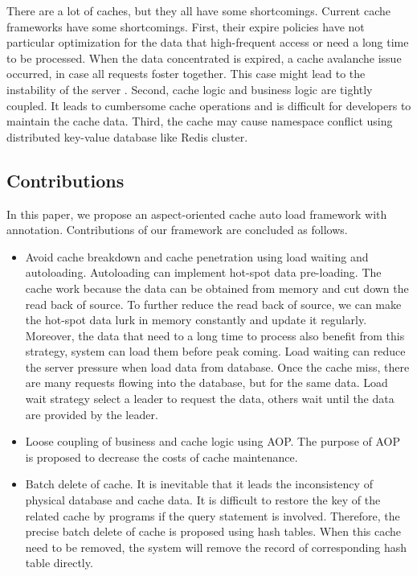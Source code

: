 \documentclass{singlecol-new}
\theoremstyle{TH}{
\newtheorem{lemma}{Lemma}
\newtheorem{theorem}[lemma]{Theorem}
\newtheorem{corrolary}[lemma]{Corrolary}
\newtheorem{conjecture}[lemma]{Conjecture}
\newtheorem{proposition}[lemma]{Proposition}
\newtheorem{claim}[lemma]{Claim}
\newtheorem{stheorem}[lemma]{Wrong Theorem}
}
\theoremstyle{THrm}{
\newtheorem{definition}{Definition}[section]
\newtheorem{question}{Question}[section]
\newtheorem{remark}{Remark}
\newtheorem{scheme}{Scheme}
}
\theoremstyle{THhit}{
\newtheorem{case}{Case}[section]
}
\begin{document}
There are a lot of caches, but they all have some shortcomings. Current cache frameworks have some shortcomings. First, their expire policies have not particular optimization for the data that high-frequent access or need a long time to be processed. When the data concentrated is expired, a cache avalanche issue occurred, in case all requests foster together. This case might lead to the instability of the server \cite{ma2017column}. Second, cache logic and business logic are tightly coupled. It leads to cumbersome cache operations and is difficult for developers to maintain the cache data. Third, the cache may cause namespace conflict using distributed key-value database like Redis cluster.

\subsection{Contributions}
In this paper, we propose an aspect-oriented cache auto load framework with annotation. Contributions of our framework are concluded as follows.

\begin{itemize}
  \item Avoid cache breakdown and cache penetration using load waiting and autoloading. Autoloading can implement hot-spot data pre-loading. The cache work because the data can be obtained from memory and cut down the read back of source. To further reduce the read back of source, we can make the hot-spot data lurk in memory constantly and update it regularly. Moreover, the data that need to a long time to process also benefit from this strategy, system can load them before peak coming. Load waiting can reduce the server pressure when load data from database. Once the cache miss, there are many requests flowing into the database, but for the same data. Load wait strategy select a leader to request the data, others wait until the data are provided by the leader.
  \item Loose coupling of business and cache logic using AOP. The purpose of AOP is proposed to decrease the costs of cache maintenance.
  \item Batch delete of cache. It is inevitable that it leads the inconsistency of physical database and cache data. It is difficult to restore the key of the related cache by programs if the query statement is involved. Therefore, the precise batch delete of cache is proposed using hash tables. When this cache need to be removed, the system will remove the record of corresponding hash table directly.
\end{itemize}
\end{document}
